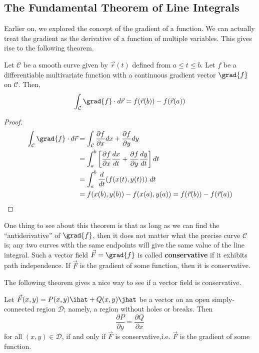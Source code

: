 \documentclass[12pt]{article}
\begin{document}
\subsection{The Fundamental Theorem of Line Integrals}
Earlier on, we explored the concept of the gradient of a function. We can actually treat the gradient as the derivative of a function of multiple variables. This gives rise to the following theorem.
\begin{theorem}
Let $\mathcal{C}$ be a smooth curve given by $\vec{r}(t)$ defined from $a \le t \le b$. Let $f$ be a differentiable multivariate function with a continuous gradient vector $\grad{f}$ on $\mathcal{C}$. Then, \[ \int_{\mathcal{C}} \grad{f} \cdot d\vec{r} = f(\vec{r}(b)) - f(\vec{r}(a)) \]
\end{theorem}

\begin{proof}
\[
\begin{aligned}
\int_{\mathcal{C}} \grad{f} \cdot d\vec{r} &= \int_{\mathcal{C}} \frac{\partial f}{\partial x} dx + \frac{\partial f}{\partial y} dy \\
&= \int_a^b \left[\frac{\partial f}{\partial x}\frac{dx}{dt} + \frac{\partial f}{\partial y}\frac{dy}{dt}\right] dt \\
&= \int_a^b \frac{d}{dt}(f(x(t),y(t))) \ dt \\
&= f(x(b),y(b)) - f(x(a),y(a)) = f(\vec{r}(b)) - f(\vec{r}(a))
\end{aligned}
\]
\end{proof}

One thing to see about this theorem is that as long as we can find the ``antiderivative'' of $\grad{f}$, then it does not matter what the precise curve $\mathcal{C}$ is; any two curves with the same endpoints will give the same value of the line integral. Such a vector field $\vec{F} = \grad{f}$ is called \textbf{conservative} if it exhibits path independence. If $\vec{F}$ is the gradient of some function, then it is conservative. 

The following theorem gives a nice way to see if a vector field is conservative.
\begin{theorem}
Let $\vec{F}(x,y) = P(x,y)\ihat + Q(x,y)\jhat$ be a vector on an open simply-connected region $\mathcal{D}$; namely, a region without holes or breaks. Then \[ \frac{\partial P}{\partial y} = \frac{\partial Q}{\partial x} \] for all $(x,y) \in \mathcal{D}$, if and only if $\vec{F}$ is conservative,i.e. $\vec{F}$ is the gradient of some function.
\end{theorem}
\end{document}
